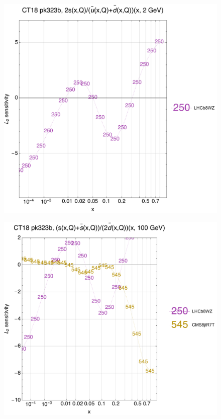 \documentclass[10pt,aps,prd,floatfix,titlepage]{revtex4}
\begin{document}
\begin{figure}
\includegraphics[width=\textwidth,height=0.44\textheight,keepaspectratio]{2/rat_ifl5_ct18nn_L2_q2_Sf_2.pdf}
\caption{}
\end{figure}
\clearpage
\begin{figure}
\includegraphics[width=\textwidth,height=0.44\textheight,keepaspectratio]{2/rat_ifl6_ct18nn_L2_q100_Sf_2.pdf}
\caption{}
\end{figure}
\end{document}

